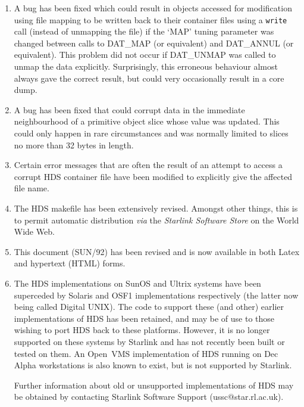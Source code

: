 \documentclass[11pt]{article}
\newcommand{\htmlref}[2]{#1}
\newcommand{\hi}[1]{{\tt{#1}}}
\newcommand{\st}[1]{{\em{#1}}}
\begin{document}
\begin{enumerate}
\item A bug has been fixed which could result in objects accessed for
modification using file mapping to be written back to their container
files using a \hi{write} call (instead of unmapping the file) if the
`MAP' tuning parameter was changed between calls to
\htmlref{DAT\_MAP}{DAT_MAP} (or equivalent) and
\htmlref{DAT\_ANNUL}{DAT_ANNUL} (or equivalent). This problem did not
occur if \htmlref{DAT\_UNMAP}{DAT_UNMAP} was called to unmap the data
explicitly. Surprisingly, this erroneous behaviour almost always gave
the correct result, but could very occasionally result in a core dump.

\item A bug has been fixed that could corrupt data in the immediate
neighbourhood of a primitive object slice whose value was
updated. This could only happen in rare circumstances and was normally
limited to slices no more than 32 bytes in length.

\item Certain error messages that are often the result of an attempt
to access a corrupt HDS container file have been modified to
explicitly give the affected file name.

\item The HDS makefile has been extensively revised. Amongst other
things, this is to permit automatic distribution \st{via} the
\st{Starlink Software Store} on the World Wide Web.

\item This document (SUN/92) has been revised and is now available in
both Latex and hypertext (HTML) forms.

\item The HDS implementations on SunOS and Ultrix systems have been
superceded by Solaris and OSF1 implementations respectively (the
latter now being called Digital UNIX). The code to support these (and
other) earlier implementations of HDS has been retained, and may be of
use to those wishing to port HDS back to these platforms. However, it
is no longer supported on these systems by Starlink and has not
recently been built or tested on them.  An Open~VMS implementation of
HDS running on Dec Alpha workstations is also known to exist, but is
not supported by Starlink.

Further information about old or unsupported implementations of HDS
may be obtained by contacting Starlink Software Support
(ussc@star.rl.ac.uk).

\end{enumerate}
\end{document}
